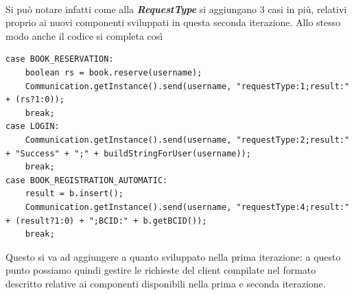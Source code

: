 \\ \noindent
Si può notare infatti come alla \textbf{\textit{RequestType}} si aggiungano 3 casi in più, relativi proprio ai nuovi componenti sviluppati in questa seconda iterazione. Allo stesso modo anche il codice si completa così
\begin{lstlisting}[caption={Tipologia di richieste aggiuntive gestite durante la seconda iterazione},captionpos=b]
case BOOK_RESERVATION:
	boolean rs = book.reserve(username);
	Communication.getInstance().send(username, "requestType:1;result:" + (rs?1:0));
	break;
case LOGIN:
	Communication.getInstance().send(username, "requestType:2;result:" + "Success" + ";" + buildStringForUser(username));
	break;
case BOOK_REGISTRATION_AUTOMATIC:
	result = b.insert();
	Communication.getInstance().send(username, "requestType:4;result:" + (result?1:0) + ";BCID:" + b.getBCID());
	break;
\end{lstlisting}

Questo si va ad aggiungere a quanto sviluppato nella prima iterazione: a questo punto possiamo quindi gestire le richieste del client compilate nel formato descritto relative ai componenti disponibili nella prima e seconda iterazione.